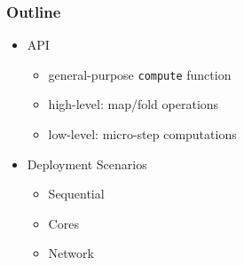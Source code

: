 \documentclass[xcolor=dvipsnames]{beamer}
\let\emph\alert
\begin{document}

\begin{frame}\frametitle{Outline}
    \begin{itemize}
    \item API
      \begin{itemize}
      \item general-purpose \texttt{compute} function
      \item high-level: map/fold operations
      \item low-level: micro-step computations
      \end{itemize}


\bigskip
    \item \emph{Deployment Scenarios}
      \begin{itemize}
      \item Sequential
      \item Cores
      \item Network
      \end{itemize}
    \end{itemize}

\end{frame}
  

\end{document}
